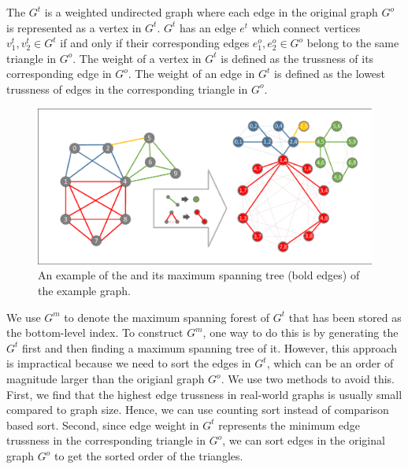 \begin{Def}[\inducedgraph{}]
The \inducedgraph{} $G^t$ is a weighted undirected graph where each edge in the original graph $G^o$ is represented as a vertex in $G^t$. $G^t$ has an edge $e^{t}$ which connect vertices $v^{t}_{1}, v^{t}_{2} \in G^{t}$ if and only if their corresponding edges $e^{o}_{1}, e^{o}_{2} \in G^{o}$ belong to the same triangle in $G^o$. The weight of a vertex in $G^{t}$ is defined as the trussness of its corresponding edge in $G^o$. The weight of an edge in $G^{t}$ is defined as the lowest trussness of edges in the corresponding triangle in $G^{o}$. %
\label{def:\inducedgraph{}}
\end{Def}

\begin{figure}[h]
    \centering
    \includegraphics[width=0.8\linewidth, trim={0.8cm 0.6cm, 0.8cm, 0.6cm}, clip]{./figures/bottom_level.pdf}
		\vspace{-0.2cm}
    \caption{An example of the \inducedgraph{} and its maximum spanning tree (bold edges) of the example graph.} %
    \label{fig:\inducedgraph{}}
		\vspace{-0.2cm}
\end{figure}

We use $G^m$ to denote the maximum spanning forest of $G^t$ that has been stored as the bottom-level index. To construct $G^m$, one way to do this is by generating the \inducedgraph{} $G^t$ first and then finding a maximum spanning tree of it. However, this approach is impractical because we need to sort the edges in $G^t$, which can be an order of magnitude larger than the origianl graph $G^o$. We use two methods to avoid this. First, we find that the highest edge trussness in real-world graphs is usually small compared to graph size. Hence, we can use counting sort instead of comparison based sort. Second, since edge weight in $G^t$ represents the minimum edge trussness in the corresponding triangle in $G^o$, we can sort edges in the original graph $G^o$ to get the sorted order of the triangles. 

